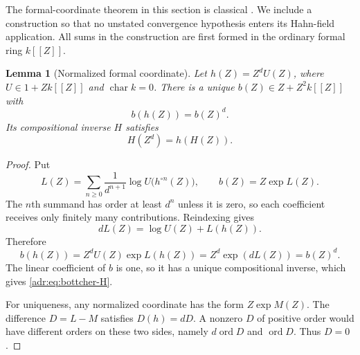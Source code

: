 \documentclass[11pt,letterpaper]{article}
\numberwithin{equation}{section}
\newtheorem{lemma}[lemma]{Lemma}
\theoremstyle{definition}
\theoremstyle{remark}
\newcommand{\ord}{\operatorname{ord}}
\begin{document}
The formal-coordinate theorem in this section is classical
\cite[Proposition~1]{SS}. We include a construction so that no unstated
convergence hypothesis enters its Hahn-field application. All sums in
the construction are first formed in the ordinary formal ring $k[[Z]]$.

\begin{lemma}[Normalized formal coordinate]\label{adr:lem:bottcher}
Let $h(Z)=Z^dU(Z)$, where $U\in1+Zk[[Z]]$ and
$\operatorname{char}k=0$. There is a unique
$b(Z)\in Z+Z^2k[[Z]]$ with
\begin{equation}\label{adr:eq:bottcher-b}
 b(h(Z))=b(Z)^d.
\end{equation}
Its compositional inverse $H$ satisfies
\begin{equation}\label{adr:eq:bottcher-H}
 H(Z^d)=h(H(Z)).
\end{equation}
\end{lemma}
\begin{proof}
Put
\begin{equation}\label{adr:eq:bottcher-log}
 L(Z)=\sum_{n\ge0}\frac{1}{d^{n+1}}
       \log U\bigl(h^{\circ n}(Z)\bigr),\qquad
 b(Z)=Z\exp L(Z).
\end{equation}
The $n$th summand has order at least $d^n$ unless it is zero, so each
coefficient receives only finitely many contributions. Reindexing gives
\[
 dL(Z)=\log U(Z)+L(h(Z)).
\]
Therefore
\[
 b(h(Z))=Z^dU(Z)\exp L(h(Z))=Z^d\exp(dL(Z))=b(Z)^d.
\]
The linear coefficient of $b$ is one, so it has a unique compositional
inverse, which gives \eqref{adr:eq:bottcher-H}.

For uniqueness, any normalized coordinate has the form $Z\exp M(Z)$.
The difference $D=L-M$ satisfies $D(h)=dD$. A nonzero $D$ of positive
order would have different orders on these two sides, namely
$d\ord D$ and $\ord D$. Thus $D=0$.
\end{proof}
\end{document}
